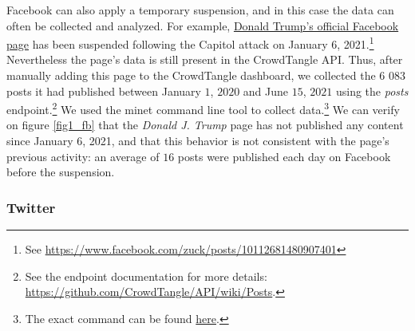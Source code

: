 \documentclass{article}
\begin{document}
Facebook can also apply a temporary suspension, and in this case the data can often be collected and analyzed. For example, \href{https://www.facebook.com/DonaldTrump/}{Donald Trump’s official Facebook page}  has been suspended following the Capitol attack on January 6, 2021.\footnote{See \href{https://www.facebook.com/zuck/posts/10112681480907401}{https://www.facebook.com/zuck/posts/10112681480907401}} Nevertheless the page’s data is still present in the CrowdTangle API. Thus, after manually adding this page to the CrowdTangle dashboard, we collected the $6$ $083$ posts it had published between January $1$, $2020$ and June $15$, $2021$ using the {\it posts} endpoint.\footnote{See the endpoint documentation for more details: \href{https://github.com/CrowdTangle/API/wiki/Posts}{https://github.com/CrowdTangle/API/wiki/Posts}.} We used the minet command line tool \cite{minet} to collect data.\footnote{The exact command can be found \href{https://github.com/medialab/truth-and-trust-online-2021/blob/master/code/collect_facebook_crowdtangle_trump_data.sh}{here}.} We can verify on figure \ref{fig1_fb} that the {\it Donald J. Trump} page has not published any content since January $6$, 2021, and that this behavior is not consistent with the page’s previous activity: an average of $16$ posts were published each day on Facebook before the suspension. 

\subsubsection{Twitter}
\end{document}
